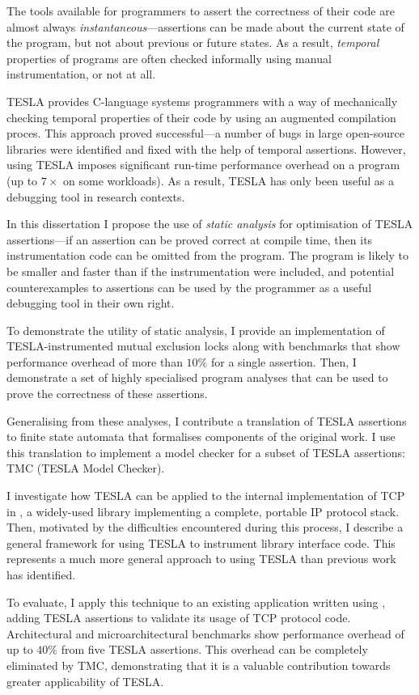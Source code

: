 The tools available for programmers to assert the correctness of their code are
almost always \emph{instantaneous}---assertions can be made about the current
state of the program, but not about previous or future states. As a result,
\emph{temporal} properties of programs are often checked informally using manual
instrumentation, or not at all.

TESLA \cite{anderson_tesla:_2014} provides C-language systems programmers with a
way of mechanically checking temporal properties of their code by using an
augmented compilation proces. This approach proved successful---a number of bugs
in large open-source libraries were identified and fixed with the help of
temporal assertions. However, using TESLA imposes significant run-time
performance overhead on a program (up to $7\times$ on some workloads). As a
result, TESLA has only been useful as a debugging tool in research contexts.

In this dissertation I propose the use of \emph{static analysis} for
optimisation of TESLA assertions---if an assertion can be proved correct at
compile time, then its instrumentation code can be omitted from the program. The
program is likely to be smaller and faster than if the instrumentation were
included, and potential counterexamples to assertions can be used by the
programmer as a useful debugging tool in their own right.

To demonstrate the utility of static analysis, I provide an implementation of
TESLA-instrumented mutual exclusion locks along with benchmarks that show
performance overhead of more than $10\%$ for a single assertion. Then, I
demonstrate a set of highly specialised program analyses that can be used to
prove the correctness of these assertions.

Generalising from these analyses, I contribute a translation of TESLA assertions
to finite state automata that formalises components of the original work. I use
this translation to implement a model checker for a subset of TESLA assertions:
TMC (TESLA Model Checker).

I investigate how TESLA can be applied to the internal implementation of TCP in
\lwip{} \cite{dunkels_design_2001}, a widely-used library implementing a
complete, portable IP protocol stack. Then, motivated by the difficulties
encountered during this process, I describe a general framework for using TESLA
to instrument library interface code. This represents a much more general
approach to using TESLA than previous work has identified.

To evaluate, I apply this technique to an existing application written using
\lwip{}, adding TESLA assertions to validate its usage of TCP protocol code.
Architectural and microarchitectural benchmarks show performance overhead of up
to $40\%$ from five TESLA assertions. This overhead can be completely eliminated
by TMC, demonstrating that it is a valuable contribution towards greater
applicability of TESLA.
